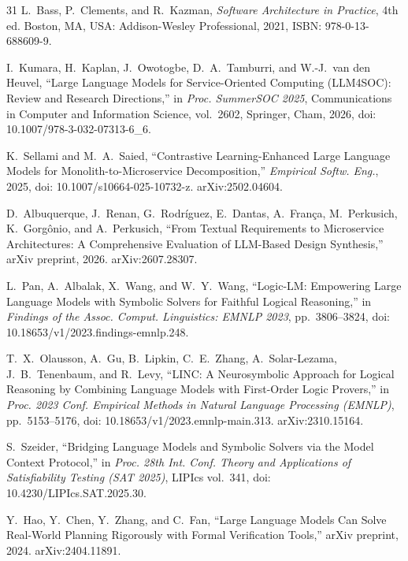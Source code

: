 \documentclass[lettersize,journal]{IEEEtran}
\begin{document}
\begin{thebibliography}{31}
L.~Bass, P.~Clements, and R.~Kazman, \textit{Software Architecture in Practice}, 4th ed. Boston, MA, USA: Addison-Wesley Professional, 2021, ISBN: 978-0-13-688609-9.

I.~Kumara, H.~Kaplan, J.~Owotogbe, D.~A.~Tamburri, and W.-J.~van den Heuvel, ``Large Language Models for Service-Oriented Computing (LLM4SOC): Review and Research Directions,'' in \textit{Proc. SummerSOC 2025}, Communications in Computer and Information Science, vol.~2602, Springer, Cham, 2026, doi: 10.1007/978-3-032-07313-6\_6.

K.~Sellami and M.~A.~Saied, ``Contrastive Learning-Enhanced Large Language Models for Monolith-to-Microservice Decomposition,'' \textit{Empirical Softw. Eng.}, 2025, doi: 10.1007/s10664-025-10732-z. arXiv:2502.04604.

D.~Albuquerque, J.~Renan, G.~Rodríguez, E.~Dantas, A.~França, M.~Perkusich, K.~Gorgônio, and A.~Perkusich, ``From Textual Requirements to Microservice Architectures: A Comprehensive Evaluation of LLM-Based Design Synthesis,'' arXiv preprint, 2026. arXiv:2607.28307.

L.~Pan, A.~Albalak, X.~Wang, and W.~Y.~Wang, ``Logic-LM: Empowering Large Language Models with Symbolic Solvers for Faithful Logical Reasoning,'' in \textit{Findings of the Assoc. Comput. Linguistics: EMNLP 2023}, pp.~3806--3824, doi: 10.18653/v1/2023.findings-emnlp.248.

T.~X.~Olausson, A.~Gu, B.~Lipkin, C.~E.~Zhang, A.~Solar-Lezama, J.~B.~Tenenbaum, and R.~Levy, ``LINC: A Neurosymbolic Approach for Logical Reasoning by Combining Language Models with First-Order Logic Provers,'' in \textit{Proc. 2023 Conf. Empirical Methods in Natural Language Processing (EMNLP)}, pp.~5153--5176, doi: 10.18653/v1/2023.emnlp-main.313. arXiv:2310.15164.

S.~Szeider, ``Bridging Language Models and Symbolic Solvers via the Model Context Protocol,'' in \textit{Proc. 28th Int. Conf. Theory and Applications of Satisfiability Testing (SAT 2025)}, LIPIcs vol.~341, doi: 10.4230/LIPIcs.SAT.2025.30.

Y.~Hao, Y.~Chen, Y.~Zhang, and C.~Fan, ``Large Language Models Can Solve Real-World Planning Rigorously with Formal Verification Tools,'' arXiv preprint, 2024. arXiv:2404.11891.


\end{thebibliography}
\end{document}
